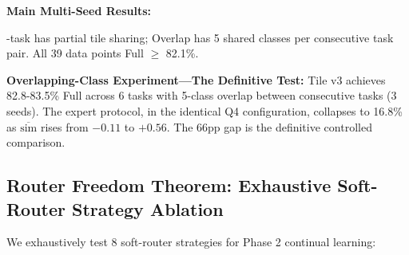 \documentclass[twoside]{article}
\theoremstyle{definition}
\begin{document}
\textbf{Main Multi-Seed Results:}

\begin{table}[ht]
\centering
\caption{Tile v3 multi-seed results}
\end{table}
-task has partial tile sharing; Overlap has 5 shared classes per consecutive task pair. All 39 data points Full $\geq$ 82.1\%.

\textbf{Overlapping-Class Experiment---The Definitive Test:} Tile v3 achieves 82.8-83.5\% Full across 6 tasks with 5-class overlap between consecutive tasks (3 seeds). The expert protocol, in the identical Q4 configuration, collapses to 16.8\% as $\overline{\text{sim}}$ rises from $-0.11$ to $+0.56$. The 66pp gap is the definitive controlled comparison.

\subsection{Router Freedom Theorem: Exhaustive Soft-Router Strategy Ablation}

We exhaustively test 8 soft-router strategies for Phase 2 continual learning:
\end{document}
